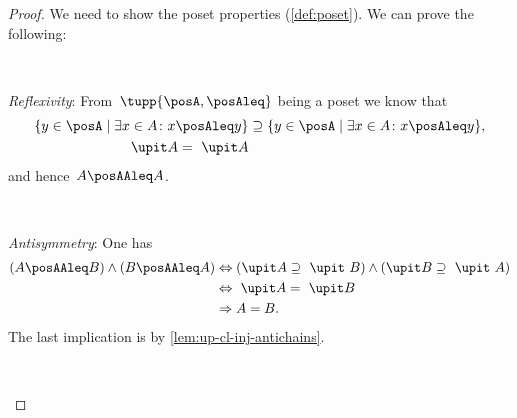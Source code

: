 \begin{proof}
  We need to show the poset properties (\cref{def:poset}).
  We can prove the following:

  \

  \begin{compactitem}
    \item \emph{Reflexivity}: From~$\tupp{\posA,\posAleq}$ being a poset we know that
    \begin{equation}
      \begin{aligned}
        \{y\in \posA \mid \exists x\in A \colon x\posAleq y\} &\supseteq \{y\in \posA \mid \exists x\in A \colon x\posAleq y\},\\
        \upit  A =\ \upit  A
      \end{aligned}
    \end{equation}
    and hence~$A\posAAleq A$.

    \

    \item \emph{Antisymmetry}: One has
    \begin{equation}
      \begin{aligned}
        \left(A\posAAleq B\right) \wedge \left(B\posAAleq A\right)
        &\Leftrightarrow \left(\upit  A \supseteq \ \upit  \ B\right) \wedge \left( \upit   B\supseteq \ \upit  \ A\right)\\
        &\Leftrightarrow \ \upit  A= \ \upit  B \\
        & \Rightarrow A = B.
      \end{aligned}
    \end{equation}
    The last implication is by  \cref{lem:up-cl-inj-antichains}.

    \



\end{compactitem}
\end{proof}
